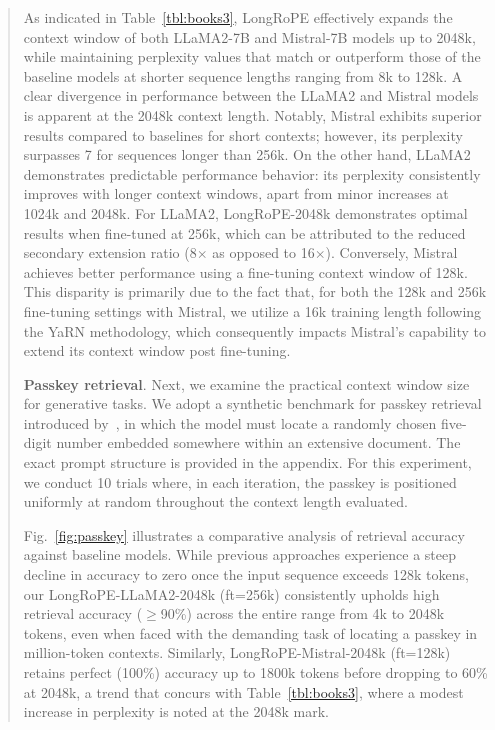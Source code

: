 \begin{abstract}
As indicated in Table~\ref{tbl:books3}, LongRoPE effectively expands the context window of both LLaMA2-7B and Mistral-7B models up to 2048k, while maintaining perplexity values that match or outperform those of the baseline models at shorter sequence lengths ranging from 8k to 128k. A clear divergence in performance between the LLaMA2 and Mistral models is apparent at the 2048k context length. Notably, Mistral exhibits superior results compared to baselines for short contexts; however, its perplexity surpasses 7 for sequences longer than 256k. On the other hand, LLaMA2 demonstrates predictable performance behavior: its perplexity consistently improves with longer context windows, apart from minor increases at 1024k and 2048k. For LLaMA2, LongRoPE-2048k demonstrates optimal results when fine-tuned at 256k, which can be attributed to the reduced secondary extension ratio (8$\times$ as opposed to 16$\times$). Conversely, Mistral achieves better performance using a fine-tuning context window of 128k. This disparity is primarily due to the fact that, for both the 128k and 256k fine-tuning settings with Mistral, we utilize a 16k training length following the YaRN methodology, which consequently impacts Mistral’s capability to extend its context window post fine-tuning.

\textbf{Passkey retrieval}. Next, we examine the practical context window size for generative tasks. We adopt a synthetic benchmark for passkey retrieval introduced by~\cite{passkey}, in which the model must locate a randomly chosen five-digit number embedded somewhere within an extensive document. The exact prompt structure is provided in the appendix. For this experiment, we conduct 10 trials where, in each iteration, the passkey is positioned uniformly at random throughout the context length evaluated.

Fig.~\ref{fig:passkey} illustrates a comparative analysis of retrieval accuracy against baseline models. While previous approaches experience a steep decline in accuracy to zero once the input sequence exceeds 128k tokens, our LongRoPE-LLaMA2-2048k (ft=256k) consistently upholds high retrieval accuracy ($\ge$90\%) across the entire range from 4k to 2048k tokens, even when faced with the demanding task of locating a passkey in million-token contexts. Similarly, LongRoPE-Mistral-2048k (ft=128k) retains perfect (100\%) accuracy up to 1800k tokens before dropping to 60\% at 2048k, a trend that concurs with Table~\ref{tbl:books3}, where a modest increase in perplexity is noted at the 2048k mark.


\end{abstract}
